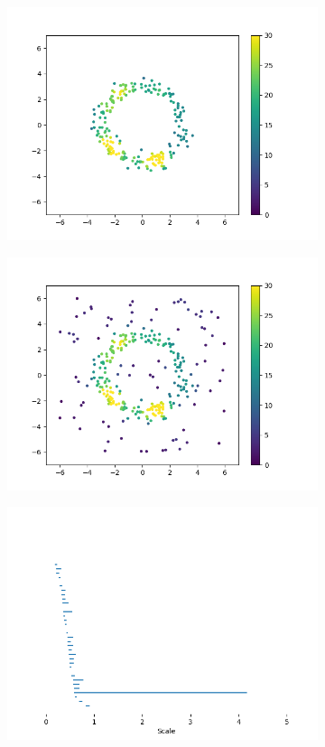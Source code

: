 \begin{figure}[h]
  \centering
  \begin{subfigure}{.45\textwidth}
    \centering
    \includegraphics[width=.9\linewidth]{./figures/circle}
    \caption{}
    \label{fig:circle}
  \end{subfigure}%
  \begin{subfigure}{.45\textwidth}
    \centering
    \includegraphics[width=.9\linewidth]{./figures/circle-all-points}
    \caption{}
    \label{fig:circle-all-points}
  \end{subfigure}
  \begin{subfigure}{.45\textwidth}
    \centering
    \includegraphics[width=.9\linewidth]{./figures/barcode-circle}

\end{subfigure}
\end{figure}
